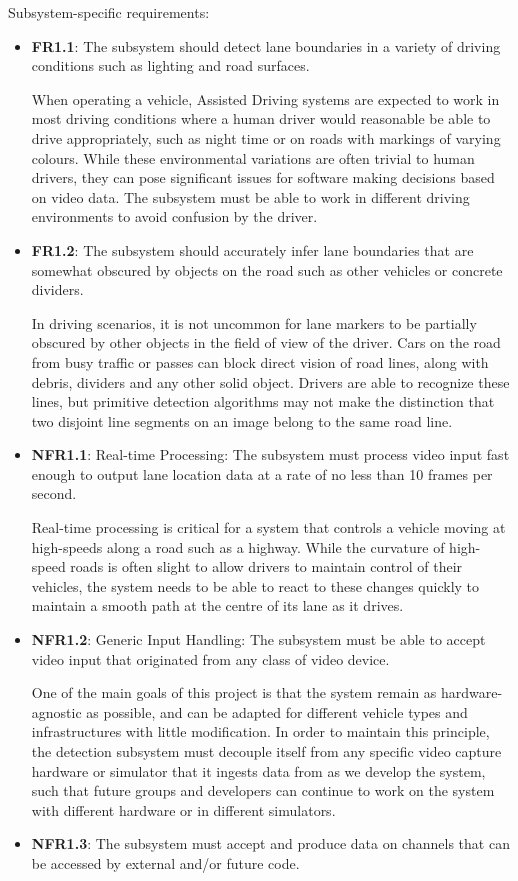 \documentclass[titlepage,draft]{article}
\begin{document}
Subsystem-specific requirements:
\begin{itemize}
	\item \textbf{FR1.1}: The subsystem should detect lane boundaries in a variety of driving conditions such as lighting and
	      road surfaces.

	      When operating a vehicle, Assisted Driving systems are expected to work in most driving conditions where a human driver
	      would reasonable be able to drive appropriately, such as night time or on roads with markings of varying colours.
	      While these environmental variations are often trivial to human drivers, they can pose significant issues for software
	      making decisions based on video data.
	      The subsystem must be able to work in different driving environments to avoid confusion by the driver.
	\item \textbf{FR1.2}: The subsystem should accurately infer lane boundaries that are somewhat obscured by objects on the
	      road such as other vehicles or concrete dividers.

	      In driving scenarios, it is not uncommon for lane markers to be partially obscured by other objects in the field of view
	      of the driver.
	      Cars on the road from busy traffic or passes can block direct vision of road lines, along with debris, dividers and any
	      other solid object.
	      Drivers are able to recognize these lines, but primitive detection algorithms may not make the distinction that two disjoint
	      line segments on an image belong to the same road line.
	\item \textbf{NFR1.1}: Real-time Processing: The subsystem must process video input fast enough to output lane location data
	      at a rate of no less than 10 frames per second.

	      Real-time processing is critical for a system that controls a vehicle moving at high-speeds along a road such as a highway.
	      While the curvature of high-speed roads is often slight to allow drivers to maintain control of their vehicles, the
	      system needs to be able to react to these changes quickly to maintain a smooth path at the centre of its lane as it drives.
	\item \textbf{NFR1.2}: Generic Input Handling: The subsystem must be able to accept video input that originated from any
	      class of video device.

	      One of the main goals of this project is that the system remain as hardware-agnostic as possible, and can be adapted for
	      different vehicle types and infrastructures with little modification.
	      In order to maintain this principle, the detection subsystem must decouple itself from any specific video capture hardware or
	      simulator that it ingests data from as we develop the system, such that future groups and developers can continue to work
	      on the system with different hardware or in different simulators.
	\item \textbf{NFR1.3}: The subsystem must accept and produce data on channels that can be accessed by external and/or future code.


\end{itemize}
\end{document}
